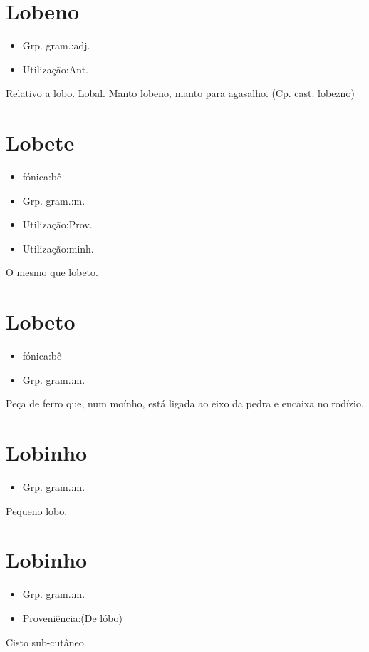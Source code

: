 \section{Lobeno}
\begin{itemize}
\item {Grp. gram.:adj.}
\end{itemize}
\begin{itemize}
\item {Utilização:Ant.}
\end{itemize}
Relativo a lobo.
Lobal.
\textunderscore Manto lobeno\textunderscore , manto para agasalho.
(Cp. cast. \textunderscore lobezno\textunderscore )
\section{Lobete}
\begin{itemize}
\item {fónica:bê}
\end{itemize}
\begin{itemize}
\item {Grp. gram.:m.}
\end{itemize}
\begin{itemize}
\item {Utilização:Prov.}
\end{itemize}
\begin{itemize}
\item {Utilização:minh.}
\end{itemize}
O mesmo que \textunderscore lobeto\textunderscore .
\section{Lobeto}
\begin{itemize}
\item {fónica:bê}
\end{itemize}
\begin{itemize}
\item {Grp. gram.:m.}
\end{itemize}
Peça de ferro que, num moínho, está ligada ao eixo da pedra e encaixa no rodízio.
\section{Lobinho}
\begin{itemize}
\item {Grp. gram.:m.}
\end{itemize}
Pequeno lobo.
\section{Lobinho}
\begin{itemize}
\item {Grp. gram.:m.}
\end{itemize}
\begin{itemize}
\item {Proveniência:(De \textunderscore lóbo\textunderscore )}
\end{itemize}
Cisto sub-cutâneo.

